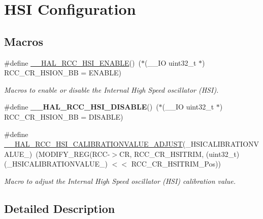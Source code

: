 \hypertarget{group___r_c_c___h_s_i___configuration}{}\section{H\+SI Configuration}
\label{group___r_c_c___h_s_i___configuration}
\subsection*{Macros}
\begin{DoxyCompactItemize}
\item 
\#define \hyperlink{group___r_c_c___h_s_i___configuration_gaab944f562b53fc74bcc0e4958388fd42}{\+\_\+\+\_\+\+H\+A\+L\+\_\+\+R\+C\+C\+\_\+\+H\+S\+I\+\_\+\+E\+N\+A\+B\+LE}()~($\ast$(\+\_\+\+\_\+\+IO uint32\+\_\+t $\ast$) R\+C\+C\+\_\+\+C\+R\+\_\+\+H\+S\+I\+O\+N\+\_\+\+BB = E\+N\+A\+B\+LE)
\begin{DoxyCompactList}\small\item\em Macros to enable or disable the Internal High Speed oscillator (H\+SI). \end{DoxyCompactList}\item 
\mbox{\label{group___r_c_c___h_s_i___configuration_ga0c0dc8bc0ef58703782f45b4e487c031}} 
\#define {\bfseries \+\_\+\+\_\+\+H\+A\+L\+\_\+\+R\+C\+C\+\_\+\+H\+S\+I\+\_\+\+D\+I\+S\+A\+B\+LE}()~($\ast$(\+\_\+\+\_\+\+IO uint32\+\_\+t $\ast$) R\+C\+C\+\_\+\+C\+R\+\_\+\+H\+S\+I\+O\+N\+\_\+\+BB = D\+I\+S\+A\+B\+LE)
\item 
\#define \hyperlink{group___r_c_c___h_s_i___configuration_ga36991d340af7ad14b79f204c748b0e3e}{\+\_\+\+\_\+\+H\+A\+L\+\_\+\+R\+C\+C\+\_\+\+H\+S\+I\+\_\+\+C\+A\+L\+I\+B\+R\+A\+T\+I\+O\+N\+V\+A\+L\+U\+E\+\_\+\+A\+D\+J\+U\+ST}(\+\_\+\+H\+S\+I\+C\+A\+L\+I\+B\+R\+A\+T\+I\+O\+N\+V\+A\+L\+U\+E\+\_\+)~(M\+O\+D\+I\+F\+Y\+\_\+\+R\+EG(R\+CC-\/$>$CR, R\+C\+C\+\_\+\+C\+R\+\_\+\+H\+S\+I\+T\+R\+IM, (uint32\+\_\+t)(\+\_\+\+H\+S\+I\+C\+A\+L\+I\+B\+R\+A\+T\+I\+O\+N\+V\+A\+L\+U\+E\+\_\+) $<$$<$ R\+C\+C\+\_\+\+C\+R\+\_\+\+H\+S\+I\+T\+R\+I\+M\+\_\+\+Pos))
\begin{DoxyCompactList}\small\item\em Macro to adjust the Internal High Speed oscillator (H\+SI) calibration value. \end{DoxyCompactList}\end{DoxyCompactItemize}


\subsection{Detailed Description}


